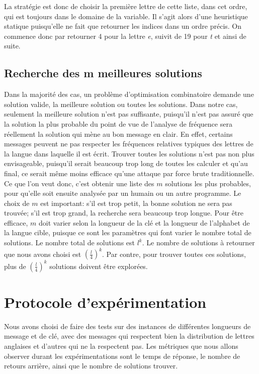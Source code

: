 \documentclass[11pt]{article}
\begin{document}
				La stratégie est donc de choisir la première lettre de cette liste, dans cet ordre, qui est toujours dans le domaine de la variable.
				Il s'agit alors d'une heuristique statique puisqu'elle ne fait que retourner les indices dans un ordre précis.
				On commence donc par retourner 4 pour la lettre \emph{e}, suivit de 19 pour \emph{t} et ainsi de suite.

		\subsection{Recherche des m meilleures solutions}
			Dans la majorité des cas, un problème d'optimisation combinatoire demande une solution valide, la meilleure solution ou toutes les solutions.
			Dans notre cas, seulement la meilleure solution n'est pas suffisante, puisqu'il n'est pas assuré que la solution la plus probable du point de vue de l'analyse de fréquence sera réellement la solution qui mène au bon message en clair.
			En effet, certains messages peuvent ne pas respecter les fréquences relatives typiques des lettres de la langue dans laquelle il est écrit.
			Trouver toutes les solutions n'est pas non plus envisageable, puisqu'il serait beaucoup trop long de toutes les calculer et qu'au final, ce serait même moins efficace qu'une attaque par force brute traditionnelle.\\

			Ce que l'on veut donc, c'est obtenir une liste des $m$ solutions les plus probables, pour qu'elle soit ensuite analysée par un humain ou un autre programme.
			Le choix de $m$ est important: s'il est trop petit, la bonne solution ne sera pas trouvée; s'il est trop grand, la recherche sera beaucoup trop longue.
			Pour être efficace, $m$ doit varier selon la longueur de la clé et la longueur de l'alphabet de la langue cible, puisque ce sont les paramètres qui font varier le nombre total de solutions.
			Le nombre total de solutions est $l^k$. Le nombre de solutions à retourner que nous avons choisi est $(\frac{l}{4})^k$.
			Par contre, pour trouver toutes ces solutions, plus de $(\frac{l}{4})^k$ solutions doivent être explorées.\\


    \section{Protocole d'expérimentation}
		Nous avons choisi de faire des tests  sur des instances de différentes longueurs de message et de clé, avec des messages qui respectent bien la distribution de lettres anglaises et d'autres qui ne la respectent pas.
		Les métriques que nous allons observer durant les expérimentations sont le temps de réponse, le nombre de retours arrière, ainsi que le nombre de solutions trouver. \\
\end{document}
